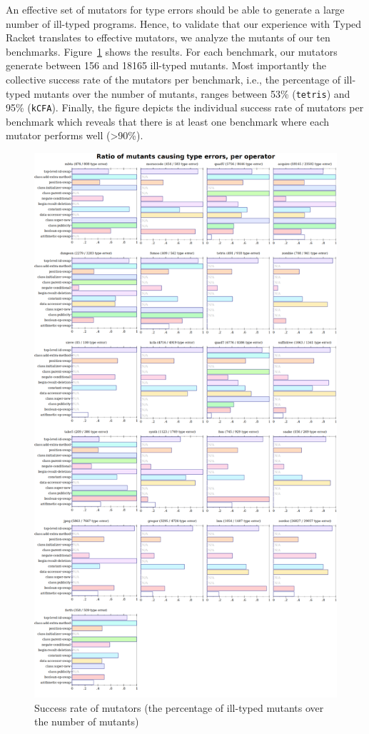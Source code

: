 An effective set of mutators for type errors should be able to generate
a large number of ill-typed programs. Hence, to validate that our experience 
with Typed Racket translates to effective mutators, we analyze the
 mutants of our ten benchmarks. Figure~\ref{fig:mutators-static-hit} shows
 the results. For each benchmark, our mutators generate between 156 and
 18165 ill-typed mutants. Most importantly the collective success rate of
 the mutators  per benchmark, i.e., the percentage of ill-typed mutants 
 over the number of mutants, ranges between 53\% (\texttt{tetris})
 and 95\% (\texttt{kCFA}). Finally, the figure depicts the individual success rate 
 of mutators per benchmark which reveals that there is at
 least one benchmark where each mutator performs well
 (>90\%).

\begin{figure}
  \centering
  \includegraphics[width=\textwidth]{./plots/code-hit-ratios}
  \caption{Success rate of mutators (the percentage of ill-typed mutants 
  over the number of mutants)}
  \label{fig:mutators-static-hit}
\end{figure}

